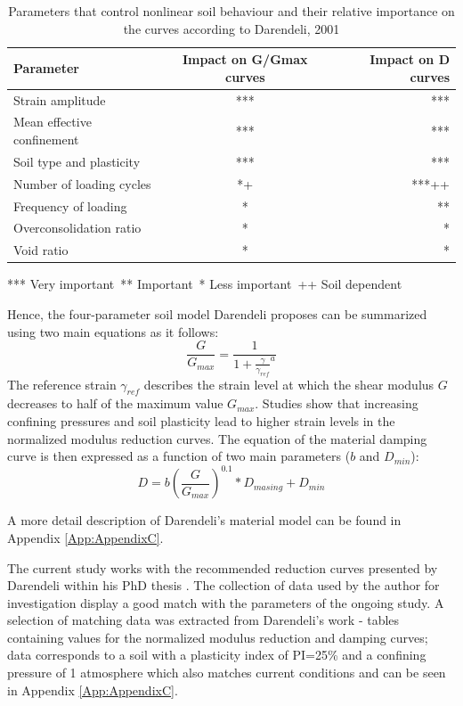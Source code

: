 \documentclass[12pt,a4paper]{report}
\begin{document}
\begin{table}[h!]
\centering
\begin{tabular}{|l|c|r|}
	\hline Parameter       &      Impact on G/Gmax curves   &  Impact on D curves     \\ 
	\hline Strain amplitude    & *** &  ***  \\ 
	\hline Mean effective confinement  & ***  &  ***  \\ 
	\hline Soil type and plasticity &  ***  &  ***    \\ 
	\hline Number of loading cycles &  *+  &  ***++    \\ 
	\hline Frequency of loading &  *  &    **    \\ 
	\hline Overconsolidation ratio &  *  &    *    \\ 
	\hline Void ratio  &   *   &    *    \\ 
	\hline
\end{tabular}

*** Very important\
** Important\
* Less important\
++ Soil dependent\
\caption{Parameters that control nonlinear soil behaviour and their relative importance on the curves according to Darendeli, 2001 \cite{darendeli2001development}}
\label{Darendeli_param}
\end{table}

Hence, the four-parameter soil model Darendeli proposes can be summarized using two main equations as it follows:
\begin{equation}
	\frac{G}{G_{max}}=\frac{1}{1+{\frac{\gamma}{\gamma_{ref}}}^a}
\end{equation}
The reference strain $\gamma_{ref}$ describes the strain level at which the shear modulus $G$ decreases to half of the maximum value $G_{max}$. Studies show that increasing confining pressures and soil plasticity lead to higher strain levels in the normalized modulus reduction curves.
The equation of the material damping curve is then expressed as a function of two main parameters ($b$ and $D_{min}$):
\begin{equation}
	D=b(\frac{G}{G_{max}})^{0.1}*D_{masing}+D_{min}
\end{equation}

A more detail description of Darendeli's material model can be found in Appendix \ref{App:AppendixC}.

The current study works with the recommended reduction curves presented by Darendeli within his PhD thesis \cite{darendeli2001development}. The collection of data used by the author for investigation display a good match with the parameters of the ongoing study. A selection of matching data was extracted from Darendeli's work - tables containing values for the normalized modulus reduction and damping curves; data corresponds to a soil with a plasticity index of PI=25\% and a confining pressure of 1 atmosphere which also matches current conditions and can be seen in Appendix \ref{App:AppendixC}.
\end{document}
